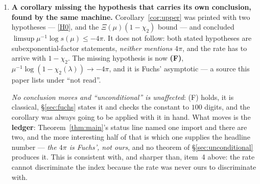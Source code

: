 \documentclass[11pt,a4paper]{article}
\theoremstyle{plain}
\theoremstyle{definition}
\theoremstyle{remark}
\begin{document}
\begin{enumerate}
remarked to need only ``boundedness near $x=1$''.  Formalising it showed the
remark names one of the two things analyticity was supplying: the proof needs
$\Phi'$ bounded near $1^+$ \emph{and} $\Phi$ right-continuous at $1$, the
second for the endpoint value itself.  \emph{The proof was not wrong and no
result moves} --- the application is to an entire function --- but the stated
weakening was, and \S\ref{sec:q1}'s hypothesis paragraph had inherited it.  It
is worth its place in this list for how it was found rather than for what it
cost: the first lemma formalised, on the first ticket, and by an artefact that
cannot be persuaded that a hypothesis is obviously enough.
\item \textbf{A corollary missing the hypothesis that carries its own
conclusion, found by the same machine.}  Corollary~\ref{cor:upper} was printed
with two hypotheses --- \eqref{H0}, and the $\Xi(\mu)(1-\chi_2)$ bound --- and
concluded $\limsup\mu^{-1}\log s(\mu)\le-4\pi$.  It does not follow: both stated
hypotheses are subexponential-factor statements, \emph{neither mentions $4\pi$},
and the rate has to arrive with $1-\chi_2$.  The missing hypothesis is now
\textbf{(F)}, $\mu^{-1}\log(1-\chi_2(\lambda))\to-4\pi$, and it is Fuchs'
asymptotic \cite{Fuchs1964} --- a source this paper lists under ``not read''.

\emph{No conclusion moves and ``unconditional'' is unaffected}: (F) holds, it is
classical, \S\ref{sec:fuchs} states it and checks the constant to $100$ digits,
and the corollary was always going to be applied with it in hand.  What moves is
the \textbf{ledger}: Theorem~\ref{thm:main}'s status line named one import and
there are two, and the more interesting half of that is which one supplies the
headline number --- \emph{the $4\pi$ is Fuchs', not ours}, and no theorem of
\S\ref{sec:unconditional} produces it.  This is consistent with, and sharper
than, item~4 above: the rate cannot discriminate the index because the rate was
never ours to discriminate with.


\end{enumerate}
\end{document}
